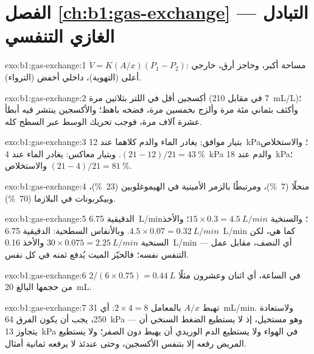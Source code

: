 \section*{الفصل \ref{ch:b1:gas-exchange} --- التبادل الغازي التنفسي}

\begin{solution}{exo:b1:gas-exchange:1}
$\dot V = K(A/x)(P_1 - P_2)$: مساحة أكبر، وحاجز أرق، 
خارجي أعلى (التهوية)،  داخلي أخفض (الترواء).
\end{solution}

\begin{solution}{exo:b1:gas-exchange:2}
أكسجين أقل في اللتر بثلاثين مرة (\qty{7}{} في مقابل
\qty{210}{mL/L})؛ وأكثف بثماني مئة مرة وألزج بخمسين مرة، فضخه
باهظ؛ والأكسجين ينتشر فيه أبطأ عشرة آلاف مرة، فوجب تحريك الوسط
عبر السطح كله.
\end{solution}

\begin{solution}{exo:b1:gas-exchange:3}
بتيار موافق: يغادر الماء والدم كلاهما عند \qty{12}{kPa}؛
والاستخلاص $(21 - 12)/21 = \qty{43}{\%}$. وبتيار معاكس: يغادر
الماء عند \qty{4}{kPa} والدم عند \qty{18}{kPa}؛ والاستخلاص
$(21 - 4)/21 =
\qty{81}{\%}$.
\end{solution}

\begin{solution}{exo:b1:gas-exchange:4}
منحلًا (\qty{7}{\%})، ومرتبطًا بالزمر الأمينية في الهيموغلوبين
(\qty{23}{\%})، وبيكربونات في البلازما (\qty{70}{\%}).
\end{solution}

\begin{solution}{exo:b1:gas-exchange:5}
الدقيقية \qty{6.75}{L/min}؛ والسنخية $15\times 0.3 = \qty{4.5}{L/min}$؛
والأخذ $4.5\times 0.07 = \qty{0.32}{L/min}$. وبالأنفاس السطحية:
الدقيقية \qty{6.75}{L/min} كما هي، لكن السنخية $30\times 0.075 =
\qty{2.25}{L/min}$ والأخذ \qty{0.16}{L/min} --- أي النصف، مقابل
عمل التنفس نفسه؛ فالحيّز الميت يُدفع ثمنه في كل نفس.
\end{solution}

\begin{solution}{exo:b1:gas-exchange:6}
$2/(6\times 0.75) = \qty{0.44}{L}$ في الساعة، أي اثنان وعشرون مثلًا
من حجمها البالغ \qty{20}{mL}.
\end{solution}

\begin{solution}{exo:b1:gas-exchange:7}
تهبط $A/x$ بالمعامل $2\times 4 = 8$: أي \qty{31}{mL/min}. ولاستعادة
\qty{250}{}، يجب أن يكون الفرق \qty{64}{kPa} --- وهو مستحيل، إذ لا
يستطيع الضغط السنخي أن يتجاوز \qty{13}{kPa} في الهواء ولا يستطيع
الدم الوريدي أن يهبط دون الصفر؛ ولا يستطيع المريض رفعه إلا بتنفس
الأكسجين، وحتى عندئذ لا يرفعه ثمانية أمثال.
\end{solution}

